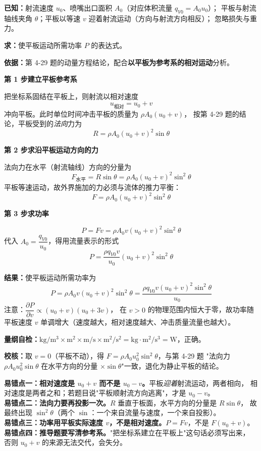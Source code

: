 \begin{jie}
\textbf{已知：}射流速度 $u_0$、喷嘴出口面积 $A_0$（对应体积流量 $q_{V0}=A_0u_0$）；
平板与射流轴线夹角 $\theta$；平板以等速 $v$ 迎着射流运动（方向与射流方向相反）；
忽略损失与重力。

\textbf{求：}使平板运动所需功率 $P$ 的表达式。

\textbf{依据：}第 4-29 题的动量方程结论，配合\textbf{以平板为参考系的相对运动}分析。

\textbf{第 1 步\quad 建立平板参考系}

把坐标系固结在平板上，则射流以相对速度
\[ u_{\text{相对}}=u_0+v \]
冲向平板。此时单位时间冲击平板的质量为 $\rho A_0\left(u_0+v\right)$，
按第 4-29 题的结论，平板受到的\emph{法向}力为
\[ R=\rho A_0\left(u_0+v\right)^2\sin\theta \]

\textbf{第 2 步\quad 求沿平板运动方向的力}

法向力在水平（射流轴线）方向的分量为
\[ F_{\text{水平}}=R\sin\theta=\rho A_0\left(u_0+v\right)^2\sin^2\theta \]
平板等速运动，故外界施加的力必须与流体的推力平衡：
\[ F=\rho A_0\left(u_0+v\right)^2\sin^2\theta \]

\textbf{第 3 步\quad 求功率}

\[ P=Fv=\rho A_0v\left(u_0+v\right)^2\sin^2\theta \]
代入 $A_0=\dfrac{q_{V0}}{u_0}$，得用流量表示的形式
\[ P=\frac{\rho q_{V0}v}{u_0}\left(u_0+v\right)^2\sin^2\theta \]

\textbf{结果：}使平板运动所需功率为
\[ P=\rho A_0v\left(u_0+v\right)^2\sin^2\theta
   =\frac{\rho q_{V0}v\left(u_0+v\right)^2\sin^2\theta}{u_0} \]
注意：$\dfrac{\partial P}{\partial v}\propto\left(u_0+v\right)\left(u_0+3v\right)$，
在 $v>0$ 的物理范围内恒大于零，故功率随平板速度 $v$ 单调增大（速度越大，相对速度越大、冲击质量流量也越大）。

\textbf{量纲自检：}$\mathrm{kg/m^3\times m^2\times m/s\times m^2/s^2}=\mathrm{kg\cdot m^2/s^3}=\mathrm{W}$，正确。

\textbf{校核：}取 $v=0$（平板不动），得 $F=\rho A_0u_0^2\sin^2\theta$，与第 4-29 题
"法向力 $\rho A_0u_0^2\sin\theta$ 在水平方向的分量 $\times\sin\theta$"一致，退化为静止平板的结论。
\end{jie}

\begin{yicuo}
\textbf{易错点一：相对速度是 $u_0+v$ 而不是 $u_0-v$。}平板\emph{迎着}射流运动，两者相向，
相对速度是两者之和；若题目说"平板顺射流方向逃离"，才是 $u_0-v$。\\
\textbf{易错点二：法向力要再投影一次。}$R$ 垂直于板面，水平方向的分量是 $R\sin\theta$，
故最终出现 $\sin^2\theta$（两个 $\sin$：一个来自流量与速度，一个来自投影）。\\
\textbf{易错点三：功率用平板实际速度 $v$，不是相对速度。}$P=Fv$，不是 $F(u_0+v)$。\\
\textbf{易错点四：推导题要写清参考系。}"把坐标系建立在平板上"这句话必须写出来，
否则 $u_0+v$ 的来源无法交代，会失分。
\end{yicuo}

